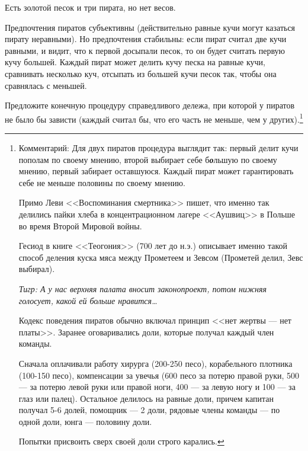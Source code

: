 \begin{problem}
\begin{source} \cite{brams:efcdp} \end{source}
Есть золотой песок и три пирата, но нет весов.\par
Предпочтения пиратов субъективны (действительно равные кучи могут казаться пирату неравными). Но предпочтения стабильны: если пират считал две кучи равными,  и видит, что к первой досыпали песок, то он будет считать первую кучу большей. Каждый пират может делить кучу песка на равные кучи, сравнивать несколько куч, отсыпать из большей кучи песок так, чтобы она сравнялась с меньшей.\par

Предложите конечную процедуру справедливого дележа, при которой у пиратов не было бы зависти (каждый считал бы, что его часть не меньше, чем у других).\footnote{ Комментарий: Для двух пиратов процедура выглядит так: первый делит кучи пополам по своему мнению, второй выбирает себе б{\bf {\it о}}льшую по своему мнению, первый забирает оставшуюся. Каждый пират может гарантировать себе не меньше половины по своему мнению. \par
Примо Леви <<Воспоминания смертника>> пишет, что именно так делились пайки хлеба в концентрационном лагере <<Аушвиц>> в Польше во время Второй Мировой войны. \par
Гесиод в книге <<Теогония>> (700 лет до н.э.) описывает именно такой способ деления куска мяса между Прометеем и Зевсом (Прометей делил, Зевс выбирал). \par
{\it Тигр: А у нас верхняя палата вносит законопроект, потом нижняя голосует, какой ей больше нравится\ldots }

Кодекс поведения пиратов обычно включал принцип <<нет жертвы --- нет платы>>. Заранее оговаривались доли, которые получал каждый член команды.\par
Сначала оплачивали работу хирурга (200-250 песо), корабельного плотника (100-150 песо), компенсации за увечья (600 песо за потерю правой руки, 500 --- за потерю левой руки или правой ноги, 400 --- за левую ногу и 100 --- за глаз или палец). Остальное делилось на равные доли, причем капитан получал 5-6 долей, помощник --- 2 доли, рядовые члены команды  --- по одной доли, юнга --- половину доли.\par
Попытки присвоить сверх своей доли строго карались\cite{brams:dps}. }



\begin{sol}

\end{sol}
\end{problem}



